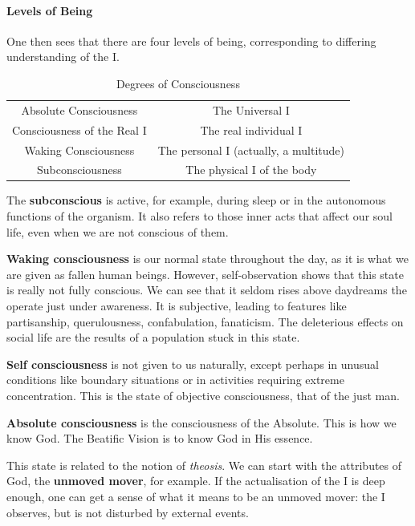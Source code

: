 \paragraph{Levels of Being}
One then sees that there are four levels of being, corresponding to differing understanding of the I.

\begin{table}[h]
\begin{tabular}{cc}\toprule
Absolute Consciousness &
The Universal I\\
Consciousness of the Real I &
The real individual I\\
Waking Consciousness &
The personal I (actually, a multitude)\\
Subconsciousness &
The physical I of the body\\\bottomrule
\end{tabular}
\caption{Degrees of Consciousness}
\label{tab:DegreesConsciousness}
\end{table}

The \textbf{subconscious} is active, for example, during sleep or in the autonomous functions of the organism. It also
refers to those inner acts that affect our soul life, even when we are not conscious of them.

\textbf{Waking consciousness} is our normal state throughout the day, as it is what we are given as fallen human beings.
However, self-observation shows that this state is really not fully conscious. We can see that it seldom rises above
daydreams the operate just under awareness. It is subjective, leading to features like partisanship, querulousness,
confabulation, fanaticism. The deleterious effects on social life are the results of a population stuck in this state.

\textbf{Self consciousness} is not given to us naturally, except perhaps in unusual conditions like boundary situations
or in activities requiring extreme concentration. This is the state of objective consciousness, that of the just man.

\textbf{Absolute consciousness} is the consciousness of the Absolute. This is how we know God. The Beatific Vision is to
know God in His essence.

This state is related to the notion of \emph{theosis}. We can start with the attributes of God, the \textbf{unmoved
mover}, for example. If the actualisation of the I is deep enough, one can get a sense of what it means to be an
unmoved mover: the I observes, but is not disturbed by external events.



